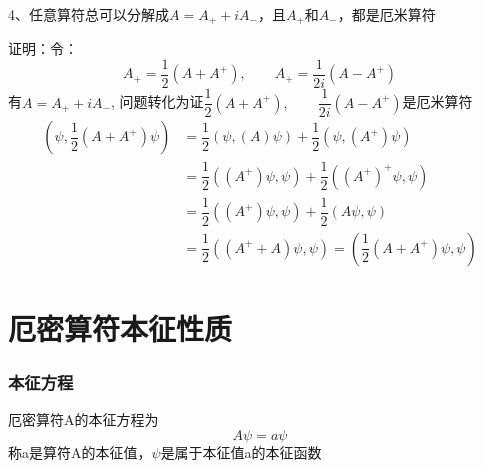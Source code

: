 \begin{frame} [allowframebreaks=]
    \frametitle{}
    \begin{exampleblock}{}
        4、任意算符总可以分解成$A=A_+ +iA_-$，且$A_+$和$A_-$，都是厄米算符
    \end{exampleblock}
    \alert{证明：}令：
    $$A_+=\dfrac{1}{2} (A+A^+), \qquad A_+=\dfrac{1}{2i} (A-A^+) $$
    有$A=A_+ +iA_-$, 问题转化为证$\dfrac{1}{2} (A+A^+), \qquad \dfrac{1}{2i} (A-A^+) $是厄米算符\\
    \begin{equation*}
        \begin{split}
            (\psi, \dfrac{1}{2} (A+A^+)\psi ) &=\dfrac{1}{2}(\psi, (A)\psi) + \dfrac{1}{2}(\psi, (A^+)\psi) \\
            &= \dfrac{1}{2}((A^+)\psi, \psi) + \dfrac{1}{2}((A^+)^+\psi, \psi) \\
            &= \dfrac{1}{2}((A^+)\psi, \psi) + \dfrac{1}{2}(A\psi, \psi) \\
            &= \dfrac{1}{2}( (A^+ + A) \psi, \psi ) =( \dfrac{1}{2}(A+A^+) \psi, \psi ) 
         \end{split}
    \end{equation*}  
\end{frame} 

\section{厄密算符本征性质}

\begin{frame}
    \frametitle{本征方程}
    厄密算符A的本征方程为
    $$ A\psi=a \psi $$
    称a是算符A的本征值，$\psi$是属于本征值a的本征函数
\end{frame} 

